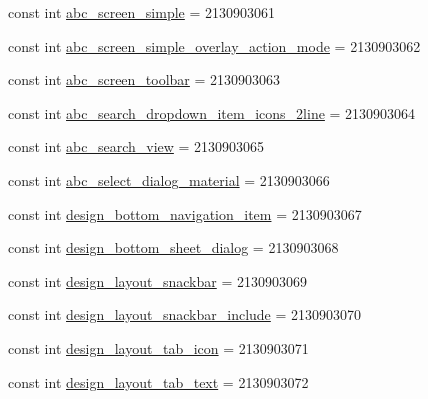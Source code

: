 \begin{DoxyCompactItemize}
\item 
const int \mbox{\hyperlink{class_f_w_p_s___app_1_1_droid_1_1_resource_1_1_layout_a10fbe9e49d8bf7e3c5931a6030915724}{abc\+\_\+screen\+\_\+simple}} = 2130903061
\item 
const int \mbox{\hyperlink{class_f_w_p_s___app_1_1_droid_1_1_resource_1_1_layout_aa590dcbdfafe8409d8922304eb9f29fd}{abc\+\_\+screen\+\_\+simple\+\_\+overlay\+\_\+action\+\_\+mode}} = 2130903062
\item 
const int \mbox{\hyperlink{class_f_w_p_s___app_1_1_droid_1_1_resource_1_1_layout_af339a943465a924aad87c4908e7066d9}{abc\+\_\+screen\+\_\+toolbar}} = 2130903063
\item 
const int \mbox{\hyperlink{class_f_w_p_s___app_1_1_droid_1_1_resource_1_1_layout_a819b9654a97ec19fe9d75675d5961869}{abc\+\_\+search\+\_\+dropdown\+\_\+item\+\_\+icons\+\_\+2line}} = 2130903064
\item 
const int \mbox{\hyperlink{class_f_w_p_s___app_1_1_droid_1_1_resource_1_1_layout_a0ca04c01cb63eb584976b13bb897ae22}{abc\+\_\+search\+\_\+view}} = 2130903065
\item 
const int \mbox{\hyperlink{class_f_w_p_s___app_1_1_droid_1_1_resource_1_1_layout_a49b934513eef01299b7786aa517fb5a6}{abc\+\_\+select\+\_\+dialog\+\_\+material}} = 2130903066
\item 
const int \mbox{\hyperlink{class_f_w_p_s___app_1_1_droid_1_1_resource_1_1_layout_a8d5e975ff48c0241c6b4d2da9fe715ef}{design\+\_\+bottom\+\_\+navigation\+\_\+item}} = 2130903067
\item 
const int \mbox{\hyperlink{class_f_w_p_s___app_1_1_droid_1_1_resource_1_1_layout_a3c929e26e52368eec54068e87071b69e}{design\+\_\+bottom\+\_\+sheet\+\_\+dialog}} = 2130903068
\item 
const int \mbox{\hyperlink{class_f_w_p_s___app_1_1_droid_1_1_resource_1_1_layout_a5710b89d1aa1becafbdceec56a8f93e9}{design\+\_\+layout\+\_\+snackbar}} = 2130903069
\item 
const int \mbox{\hyperlink{class_f_w_p_s___app_1_1_droid_1_1_resource_1_1_layout_ad48d15aaa94cb1cdb6fdd43956b03b0c}{design\+\_\+layout\+\_\+snackbar\+\_\+include}} = 2130903070
\item 
const int \mbox{\hyperlink{class_f_w_p_s___app_1_1_droid_1_1_resource_1_1_layout_a0049ba8c69446fdccc3d4f33b44319ec}{design\+\_\+layout\+\_\+tab\+\_\+icon}} = 2130903071
\item 
const int \mbox{\hyperlink{class_f_w_p_s___app_1_1_droid_1_1_resource_1_1_layout_a3dc6ccb8be9dbcc1eddf8dcadfe01f36}{design\+\_\+layout\+\_\+tab\+\_\+text}} = 2130903072

\end{DoxyCompactItemize}
